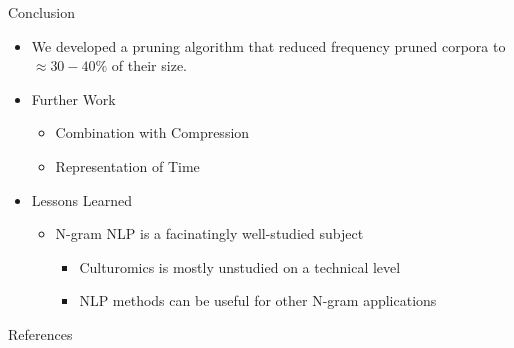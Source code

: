\documentclass[16:9,en,navbarinfooter]{sdqbeamer}
\begin{document}
\begin{frame}{Conclusion}
\begin{itemize}
    \item We developed a pruning algorithm that reduced frequency pruned corpora to $\approx 30-40\%$ of their size.
    \item Further Work 
    \begin{itemize}
        \item Combination with Compression
        \item Representation of Time
    \end{itemize}
    \item Lessons Learned
    \begin{itemize}
        \item N-gram NLP is a facinatingly well-studied subject
        \begin{itemize}
            \item Culturomics is mostly unstudied on a technical level
        \item NLP methods can be useful for other N-gram applications
        \end{itemize}
    \end{itemize}
\end{itemize}
\end{frame}
\appendix
\beginbackup{}

\begin{frame}[allowframebreaks]{References}
\printbibliography{}
\end{frame}
\end{document}
